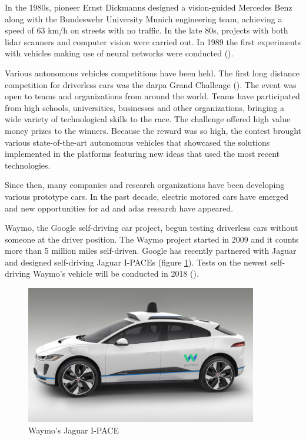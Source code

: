In the 1980s, pioneer Ernst Dickmanns designed a vision-guided Mercedes Benz along with the Bundeswehr University Munich engineering team, achieving a speed of 63 km/h on streets with no traffic. In the late 80s, projects with both \gls{lidar} scanners and computer vision were carried out. In 1989 the first experiments with vehicles making use of neural networks were conducted (\cite{Pomerleau1989}).

Various autonomous vehicles competitions have been held. The first long distance competition for driverless cars was the \gls{darpa} Grand Challenge (\cite{DARPA}). The event was open to teams and organizations from around the world. Teams have participated from high schools, universities, businesses and other organizations, bringing a wide variety of technological skills to the race. The challenge offered high value money prizes to the winners. Because the reward was so high, the contest brought various state-of-the-art autonomous vehicles that showcased the solutions implemented in the platforms featuring new ideas that used the most recent technologies.

Since then, many companies and research organizations have been developing various prototype cars. In the past decade, electric motored cars have emerged and new opportunities for \gls{ad} and \gls{adas} research have appeared. 

Waymo, the Google self-driving car project, begun testing driverless cars without someone at the driver position. The Waymo project started in 2009 and it counts more than 5 million miles self-driven. Google has recently partnered with Jaguar and designed self-driving Jaguar I-PACEs (figure \ref{fig:waymo}). Tests on the newest self-driving Waymo's vehicle will be conducted in 2018 (\cite{Waymo}).


\begin{figure}[htp]
	
	\centering
	\includegraphics[width=0.9\textwidth]{capstate/imgs/waymo}
	
	\caption{Waymo's Jaguar I-PACE}
	\label{fig:waymo}
	
\end{figure}

